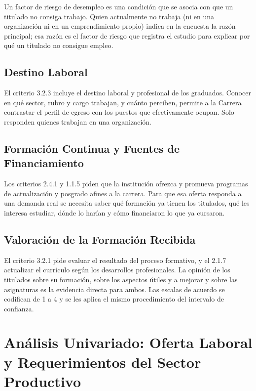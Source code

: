 \documentclass[12pt, a4paper]{article}
\begin{document}
Un factor de riesgo de desempleo es una condición que se asocia con que
un titulado no consiga trabajo. Quien actualmente no trabaja (ni en una
organización ni en un emprendimiento propio) indica en la encuesta la
razón principal; esa razón es el factor de riesgo que registra el
estudio para explicar por qué un titulado no consigue empleo.



\subsection{Destino Laboral}

El criterio 3.2.3 incluye el destino laboral y profesional de los
graduados. Conocer en qué sector, rubro y cargo trabajan, y cuánto
perciben, permite a la Carrera contrastar el perfil de egreso con los
puestos que efectivamente ocupan. Solo responden quienes trabajan en una
organización.



\subsection{Formación Continua y Fuentes de Financiamiento}

Los criterios 2.4.1 y 1.1.5 piden que la institución ofrezca y promueva
programas de actualización y posgrado afines a la carrera. Para que esa
oferta responda a una demanda real se necesita saber qué formación ya
tienen los titulados, qué les interesa estudiar, dónde lo harían y cómo
financiaron lo que ya cursaron.



\subsection{Valoración de la Formación Recibida}

El criterio 3.2.1 pide evaluar el resultado del proceso formativo, y el
2.1.7 actualizar el currículo según los desarrollos profesionales. La
opinión de los titulados sobre su formación, sobre los aspectos útiles y
a mejorar y sobre las asignaturas es la evidencia directa para ambos.
Las escalas de acuerdo se codifican de 1 a 4 y se les aplica el mismo
procedimiento del intervalo de confianza.



\section{Análisis Univariado: Oferta Laboral y Requerimientos del Sector Productivo}\label{sec:empleadores}
\end{document}
